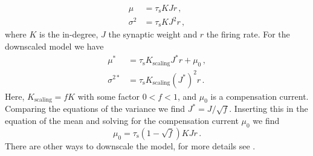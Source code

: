\documentclass[10pt,a4paper,twoside,american]{article}
\theoremstyle{definitionstyle}
\newcommand{\tauS}{\tau_\text{s}}
\begin{document}
\begin{enumerate}
\begin{equation*}
  \begin{aligned}
    \mu &= \tauS K J r \, ,\\
    \sigma^2 &= \tauS K J^2 r \, ,
  \end{aligned}
\end{equation*}
where $K$ is the in-degree, $J$ the synaptic weight and $r$ the firing rate. For the downscaled model we have
\begin{equation*}
  \begin{aligned}
    \mu^{*} &= \tauS K_{\text{scaling}} J^{*} r + \mu_{0}\, ,\\
    \sigma^{2*} &= \tauS K_{\text{scaling}} (J^{*})^2 r\, .
  \end{aligned}
\end{equation*}
Here, $K_{\text{scaling}}=f K$ with some factor $0<f<1$, and $\mu_{0}$ is a compensation current. Comparing the equations of the variance we find $J^{*}=J/\sqrt{f}$. Inserting this in the equation of the mean and solving for the compensation current $\mu_{0}$ we find
\begin{equation*}
  \mu_{0} = \tauS \left(1 - \sqrt{f}\right) K J r\, .
\end{equation*}
There are other ways to downscale the model, for more details see \citep{vanAlbada15}.
\end{enumerate}
\end{document}
